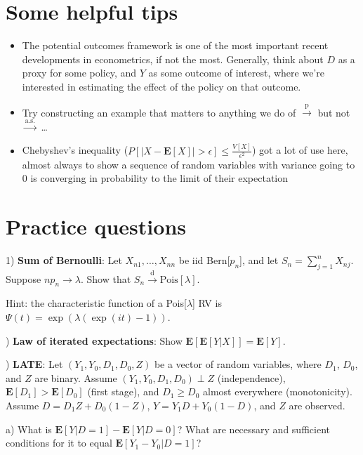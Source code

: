 \documentclass[12pt,english]{article}
\begin{document}
\section{Some helpful tips}

\begin{itemize}
	\item The potential outcomes framework is one of the most important recent developments in econometrics, if not the most. Generally, think about $D$ as a proxy for some policy, and $Y$ as some outcome of interest, where we're interested in estimating the effect of the policy on that outcome.
	\item Try constructing an example that matters to anything we do of $\overset{\text{p}}{\to}$ but not $\overset{\text{a.s.}}{\to}$ \ldots
	\item Chebyshev's inequality ($P[|X - \mathbf{E}[X]| > \epsilon] \leq \frac{V[X]}{\epsilon^{2}}$) got a lot of use here, almost always to show a sequence of random variables with variance going to 0 is converging in probability to the limit of their expectation
\end{itemize}

\section{Practice questions}

1) \textbf{Sum of Bernoulli}: Let $X_{n1}, \ldots, X_{nn}$ be iid Bern[$p_{n}$], and let $S_{n} = \sum_{j = 1}^{n} X_{nj}$. Suppose $np_{n} \to \lambda$. Show that $S_{n} \overset{\text{d}}{\to} \text{Pois}[\lambda]$.

Hint: the characteristic function of a Pois[$\lambda$] RV is $\Psi(t) = \exp(\lambda(\exp(it) - 1))$.

\vspace{1em}
) \textbf{Law of iterated expectations}: Show $\mathbf{E}[\mathbf{E}[Y | X]] = \mathbf{E}[Y]$.

\vspace{1em}
) \textbf{LATE}: Let $(Y_{1}, Y_{0}, D_{1}, D_{0}, Z)$ be a vector of random variables, where $D_{1}$, $D_{0}$, and $Z$ are binary. Assume $(Y_{1}, Y_{0}, D_{1}, D_{0}) \perp Z$ (independence), $\mathbf{E}[D_{1}] > \mathbf{E}[D_{0}]$ (first stage), and $D_{1} \geq D_{0}$ almost everywhere (monotonicity). Assume $D = D_{1} Z + D_{0} (1 - Z)$, $Y = Y_{1} D + Y_{0} (1 - D)$, and $Z$ are observed.

a) What is $\mathbf{E}[Y | D = 1] - \mathbf{E}[Y | D = 0]$? What are necessary and sufficient conditions for it to equal $\mathbf{E}[Y_{1} - Y_{0} | D = 1]$?
\end{document}

